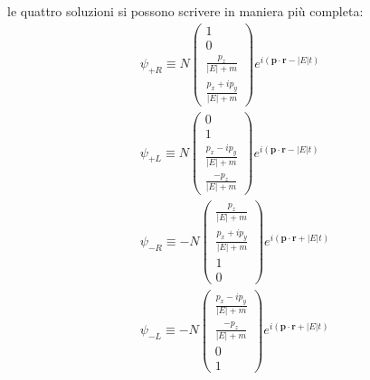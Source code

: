 \documentclass{subnucbo}
\begin{document}
                le quattro soluzioni si possono scrivere in maniera più completa:
                \begin{subequations}
                        \begin{align}
                                \psi_{+R} \equiv N \left( \begin{array} { c } { 1 } \\ { 0 } \\ { \frac {  p _ { z } } { |E| + m  } } \\ { \frac { p _ { x } + i p _ { y } } { |E| + m } } \end{array} \right) e ^ { i ( \mathbf { p } \cdot \mathbf { r } - | E | t ) } \\
                                \psi_{+L} \equiv N \left( \begin{array} { c } { 0 } \\ { 1 } \\ { \frac {  p _ { x } - i p _ { y }  } { |E| + m  } } \\ { \frac { - p _ { z } } { |E| + m } } \end{array} \right) e ^ { i ( \mathbf { p } \cdot \mathbf { r } - | E | t ) } \\
                                \psi_{-R} \equiv -N \left( \begin{array} { c } { \frac {  p _ { z }  } { |E| + m  } } \\ { \frac { p _ { x } + i p _ { y } } { |E| + m  } } \\ {1} \\ {0} \end{array} \right)  e ^ { i ( \mathbf { p } \cdot \mathbf { r } + | E | t ) } \\
                                \psi_{-L} \equiv -N \left( \begin{array} { c } { \frac {  p _ { x } - i p _ { y }  } { |E| + m  } } \\ { \frac {   - p _ { z }  } { |E| + m  } } \\ {0} \\ {1} \end{array} \right) e ^ { i ( \mathbf { p } \cdot \mathbf { r } + | E | t ) }
                        \end{align}
                        \label{eq:dirac_sol_four}
                \end{subequations}
\end{document}
